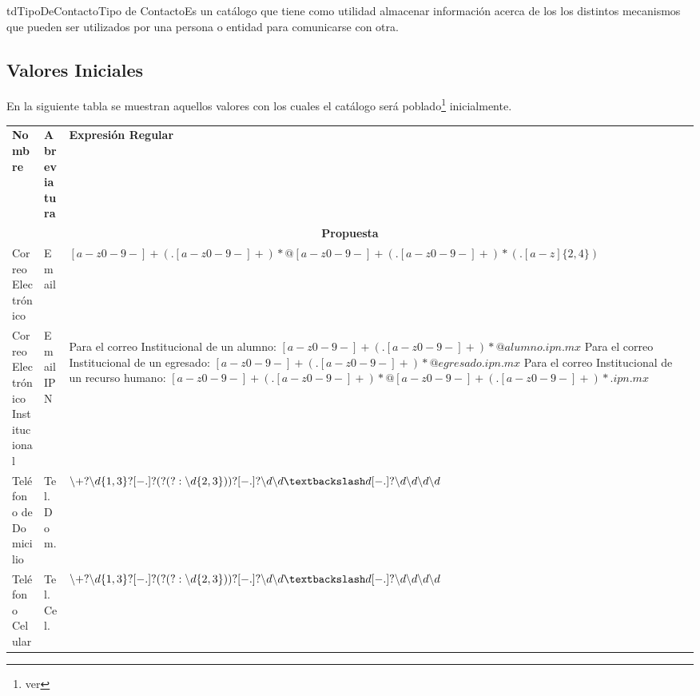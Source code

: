 	\begin{TipoDeDato}{tdTipoDeContacto}{Tipo de Contacto}{Es un catálogo que tiene como utilidad almacenar información acerca de los los distintos mecanismos que pueden ser utilizados por una persona o entidad para comunicarse con otra.}
	
	\begin{tdAtributos}
			
	\end{tdAtributos}
	
	\subsection{Valores Iniciales}
		En la siguiente tabla se muestran aquellos valores con los cuales el catálogo será poblado\footnote{ver } inicialmente.\cdtEmpty
		
		\begin{longtable}{| p{}| p{}| p{} |}
	 			\rowcolor{colorPrincipal}
	 			\multicolumn{3}{|c|}{\bf \color{white} Valores Iniciales}\\
	 			\hline
	 			\rowcolor{colorSecundario}
	 			\bf \color{white} Nombre & \bf \color{white} Abreviatura & \bf\color{white} Expresión Regular\\
	 			\hline
	 			\multicolumn{3}{|c|}{\bf \color{colorPrincipal}Propuesta}\\
	 			\hline
	 			Correo Electrónico & Email & $[a-z0-9-]+(.[a-z0-9-]+)*@[a-z0-9-]+(.[a-z0-9-]+)*(.[a-z]\{2,4\})$\\
	 			\hline
	 			Correo Electrónico Institucional & EmailIPN & \begin{Titemize}
	 					\Titem Para el correo Institucional de un alumno:
	 						$[a-z0-9-]+(.[a-z0-9-]+)*@alumno.ipn.mx$
						\Titem Para el correo Institucional de un egresado:
							$[a-z0-9-]+(.[a-z0-9-]+)*@egresado.ipn.mx$
						\Titem Para el correo Institucional de un recurso humano:
							$[a-z0-9-]+(.[a-z0-9-]+)*@[a-z0-9-]+(.[a-z0-9-]+)*.ipn.mx$
	 			\end{Titemize} \\
	 			\hline
	 			Teléfono de Domicilio & Tel. Dom. & $\backslash +?\backslash d\{1,3\}?[- .]?(?(?:\backslash d\{2,3\}))?[- .]?\backslash d\backslash d\textbackslash d[- .]?\backslash d\backslash d\backslash d\backslash d$  \\
	 			\hline
	 			Teléfono Celular & Tel. Cel. & $\backslash +?\backslash d\{1,3\}?[- .]?(?(?:\backslash d\{2,3\}))?[- .]?\backslash d\backslash d\textbackslash d[- .]?\backslash d\backslash d\backslash d\backslash d$   \\
	 			\hline
	 		\end{longtable}
	\end{TipoDeDato}
	
